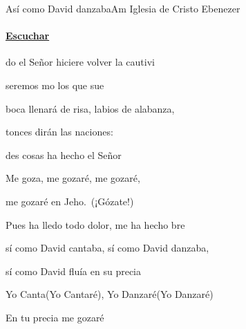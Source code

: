 \documentclass[12pt, spanish]{book}
\newcommand{\NotCCLIed}{\relax}
\begin{document}
    \begin{song}{Así como David danzaba}{Am}
    {\SBPubDom} %
    {Iglesia de Cristo Ebenezer}
    {} %
    {} %
        \ifChordBk
        \paragraph{\mbox{}\hfill\protect\href{https://open.spotify.com/intl-es/track/4WgTEN3UvmfjDGTyazGf7m}{Escuchar}\mbox{}\hfill}
        \fi


        \begin{SBOpGroup}
            do el Señor hiciere volver la cautivi

            seremos mo los que sue
        \end{SBOpGroup}
        \vskip 20pt
        \begin{SBOpGroup}

             boca llenará de risa,  labios de alabanza,

            tonces dirán las naciones:

            des cosas ha hecho el Señor
        \end{SBOpGroup}

        \vskip 20pt
        \begin{SBOpGroup}
            Me goza, me gozaré, me gozaré,

            me gozaré en Jeho.~(¡Gózate!)

            Pues ha lledo todo dolor, me ha hecho bre
        \end{SBOpGroup}
        \vskip 20pt
        \begin{SBChorus}
            sí como David cantaba, sí como David danzaba,

            sí como David fluía en su precia
        \end{SBChorus}

        \begin{SBOpGroup}
            Yo Canta(Yo Cantaré),  Yo Danzaré(Yo Danzaré)

            En tu precia me gozaré


\end{SBOpGroup}
\end{song}
\end{document}
